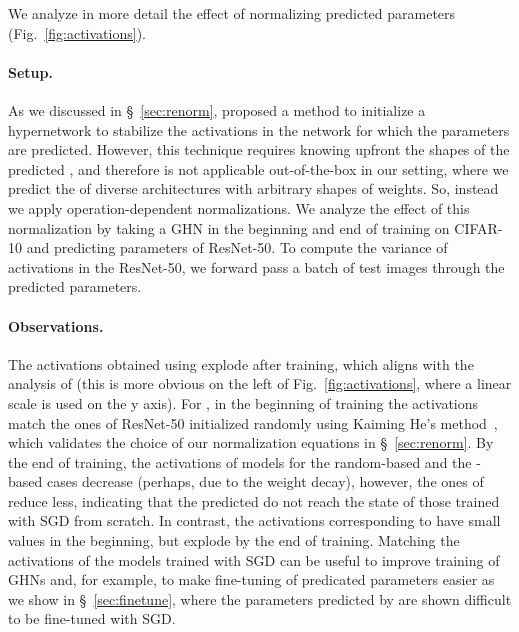 We analyze in more detail the effect of normalizing predicted parameters (Fig.~\ref{fig:activations}).

\paragraph{Setup.}
As we discussed in \S~\ref{sec:renorm}, \citet{chang2019principled} proposed a method to initialize a hypernetwork to stabilize the activations in the network for which the parameters are predicted. However, this technique requires knowing upfront the shapes of the predicted \params, and therefore is not applicable out-of-the-box in our setting, where we predict the \params of diverse architectures with arbitrary shapes of weights. So, instead we apply {operation-dependent normalizations}. We analyze the effect of this normalization by taking a GHN in the beginning and end of training on CIFAR-10 and predicting parameters of ResNet-50. To compute the variance of activations in the ResNet-50, we forward pass a batch of test images through the predicted parameters. 

\paragraph{Observations.} The activations obtained using \ghnbase explode after training, which aligns with the analysis of \cite{chang2019principled} (this is more obvious on the left of Fig.~\ref{fig:activations}, where a linear scale is used on the y axis). For \ghnours, in the beginning of training the activations match the ones of ResNet-50 initialized randomly using Kaiming He's method~\cite{he2015delving}, which validates the choice of our normalization equations in \S~\ref{sec:renorm}. By the end of training, the activations of models for the random-based and the \ghnours-based cases decrease (perhaps, due to the weight decay), however, the ones of \ghnours reduce less, indicating that the predicted \params do not reach the state of those trained with SGD from scratch. In contrast, the activations corresponding to \ghnbase have small values in the beginning, but explode by the end of training. Matching the activations of the models trained with SGD can be useful to improve training of GHNs and, for example, to make fine-tuning of predicated parameters easier as we show in \S~\ref{sec:finetune}, where the parameters predicted by \ghnbase are shown difficult to be fine-tuned with SGD.

